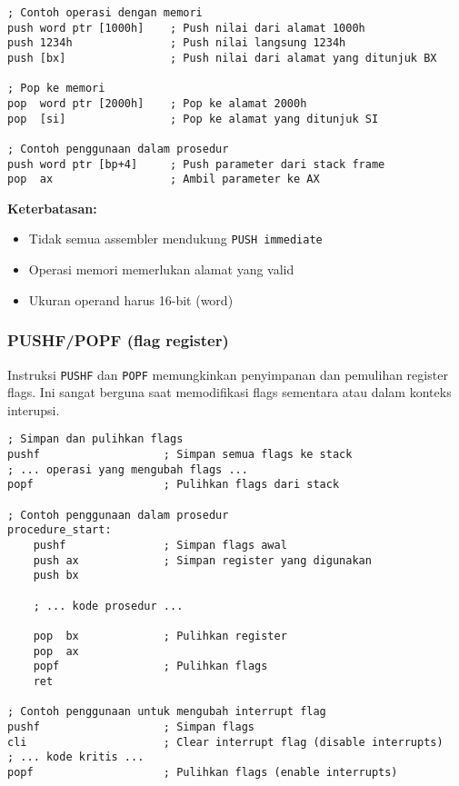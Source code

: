 \documentclass[../main.tex]{subfiles}
\begin{document}
                \begin{lstlisting}[language={[x86masm]Assembler}, caption=Operasi PUSH/POP Memori, label={lst:push-pop-memory}]
; Contoh operasi dengan memori
push word ptr [1000h]    ; Push nilai dari alamat 1000h
push 1234h               ; Push nilai langsung 1234h
push [bx]                ; Push nilai dari alamat yang ditunjuk BX

; Pop ke memori
pop  word ptr [2000h]    ; Pop ke alamat 2000h
pop  [si]                ; Pop ke alamat yang ditunjuk SI

; Contoh penggunaan dalam prosedur
push word ptr [bp+4]     ; Push parameter dari stack frame
pop  ax                  ; Ambil parameter ke AX
                \end{lstlisting}

                \textbf{Keterbatasan:}
                \begin{itemize}
                    \item Tidak semua assembler mendukung \texttt{PUSH immediate}
                    \item Operasi memori memerlukan alamat yang valid
                    \item Ukuran operand harus 16-bit (word)
                \end{itemize}

            \subsubsection{PUSHF/POPF (flag register)}
                Instruksi \texttt{PUSHF} dan \texttt{POPF} memungkinkan penyimpanan dan pemulihan register flags. Ini sangat berguna saat memodifikasi flags sementara atau dalam konteks interupsi.

                \begin{lstlisting}[language={[x86masm]Assembler}, caption=Operasi PUSHF/POPF, label={lst:pushf-popf}]
; Simpan dan pulihkan flags
pushf                   ; Simpan semua flags ke stack
; ... operasi yang mengubah flags ...
popf                    ; Pulihkan flags dari stack

; Contoh penggunaan dalam prosedur
procedure_start:
    pushf               ; Simpan flags awal
    push ax             ; Simpan register yang digunakan
    push bx
    
    ; ... kode prosedur ...
    
    pop  bx             ; Pulihkan register
    pop  ax
    popf                ; Pulihkan flags
    ret

; Contoh penggunaan untuk mengubah interrupt flag
pushf                   ; Simpan flags
cli                     ; Clear interrupt flag (disable interrupts)
; ... kode kritis ...
popf                    ; Pulihkan flags (enable interrupts)
                \end{lstlisting}
\end{document}
